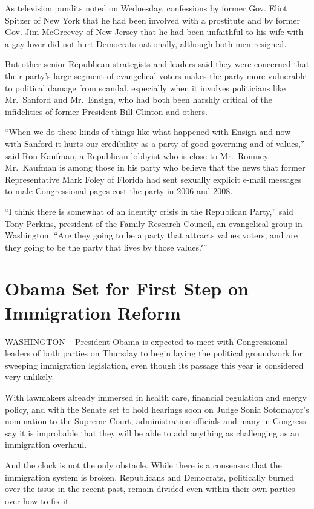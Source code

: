 ﻿\documentclass[12pt]{article}
\begin{document}
As television pundits noted on Wednesday, confessions by former Gov. Eliot Spitzer of New York that
he had been involved with a prostitute and by former Gov. Jim McGreevey of New Jersey that he had
been unfaithful to his wife with a gay lover did not hurt Democrats nationally, although both men
resigned.

But other senior Republican strategists and leaders said they were concerned that their party's
large segment of evangelical voters makes the party more vulnerable to political damage from
scandal, especially when it involves politicians like Mr.~Sanford and Mr.~Ensign, who had both been
harshly critical of the infidelities of former President Bill Clinton and others.

``When we do these kinds of things like what happened with Ensign and now with Sanford it hurts our
credibility as a party of good governing and of values,'' said Ron Kaufman, a Republican lobbyist
who is close to Mr.~Romney. Mr.~Kaufman is among those in his party who believe that the news that
former Representative Mark Foley of Florida had sent sexually explicit e-mail messages to male
Congressional pages cost the party in 2006 and 2008.

``I think there is somewhat of an identity crisis in the Republican Party,'' said Tony Perkins,
president of the Family Research Council, an evangelical group in Washington. ``Are they going to be
a party that attracts values voters, and are they going to be the party that lives by those
values?''

\section{Obama Set for First Step on Immigration Reform}

WASHINGTON -- President Obama is expected to meet with Congressional leaders of both parties on
Thursday to begin laying the political groundwork for sweeping immigration legislation, even though
its passage this year is considered very unlikely.

With lawmakers already immersed in health care, financial regulation and energy policy, and with the
Senate set to hold hearings soon on Judge Sonia Sotomayor's nomination to the Supreme Court,
administration officials and many in Congress say it is improbable that they will be able to add
anything as challenging as an immigration overhaul.

And the clock is not the only obstacle. While there is a consensus that the immigration system is
broken, Republicans and Democrats, politically burned over the issue in the recent past, remain
divided even within their own parties over how to fix it.
\end{document}
